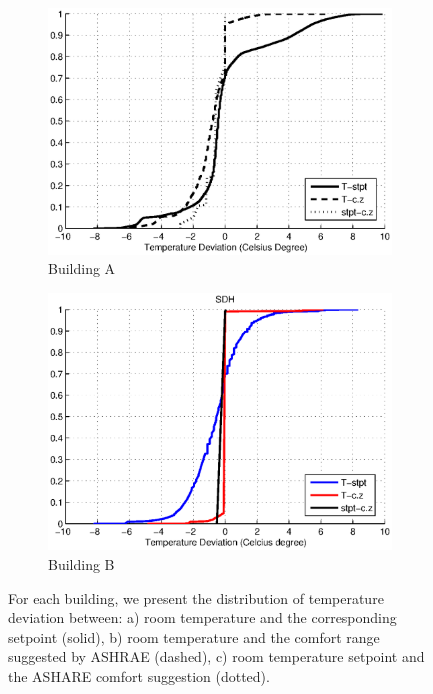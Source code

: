 \begin{figure}[h!]
\centering
	\begin{subfigure}{0.48\textwidth}
                \centering
		\includegraphics[width=\textwidth]{./figs/Soda_new.eps}
                \caption{Building A}
	\end{subfigure}
	\begin{subfigure}{0.48\textwidth}
                \centering
		\includegraphics[width=\textwidth]{./figs/SDH_new.eps}
                \caption{Building B}
	\end{subfigure}
\caption{For each building, we present the distribution of temperature deviation between: a) room temperature and the corresponding setpoint (solid), b) room temperature and the comfort range suggested by ASHRAE (dashed), c) room temperature setpoint and the ASHARE comfort suggestion (dotted).}
\label{fig:cdf_temp}
\end{figure}

